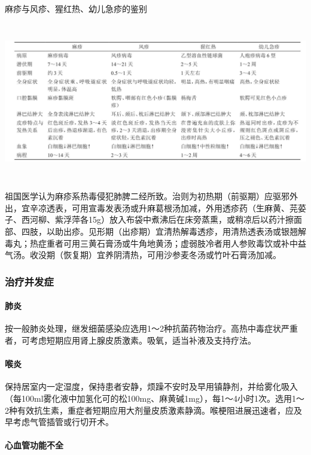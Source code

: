 \begin{table}[htbp]
\centering
\caption{麻疹与风疹、猩红热、幼儿急疹的鉴别}
\label{tab72-1}
\includegraphics[width=6.79167in,height=2.71875in]{./images/Image00364.jpg}
\end{table}

祖国医学认为麻疹系热毒侵犯肺脾二经所致。治则为初热期（前驱期）应驱邪外出，宜辛凉透表，可用宣毒发表汤或升麻葛根汤加减，外用透疹药（生麻黄、芫荽子、西河柳、紫浮萍各15g）放入布袋中煮沸后在床旁蒸熏，或稍凉后以药汁擦面部、四肢，以助出疹。见形期（出疹期）宜清热解毒透疹，用清热透表汤或银翘解毒丸；热症重者可用三黄石膏汤或牛角地黄汤；虚弱肢冷者用人参败毒饮或补中益气汤。收没期（恢复期）宜养阴清热，可用沙参麦冬汤或竹叶石膏汤加减。

\subsubsection{治疗并发症}

\paragraph{肺炎}

按一般肺炎处理，继发细菌感染应选用1～2种抗菌药物治疗。高热中毒症状严重者，可考虑短期应用肾上腺皮质激素。吸氧，适当补液及支持疗法。

\paragraph{喉炎}

保持居室内一定湿度，保持患者安静，烦躁不安时及早用镇静剂，并给雾化吸入（每100ml雾化液中加氢化可的松100mg、麻黄碱1mg），每1～4小时1次。选用1～2种有效抗生素，重症者短期应用大剂量皮质激素静滴。喉梗阻进展迅速者，应及早考虑气管插管或行切开术。

\paragraph{心血管功能不全}

